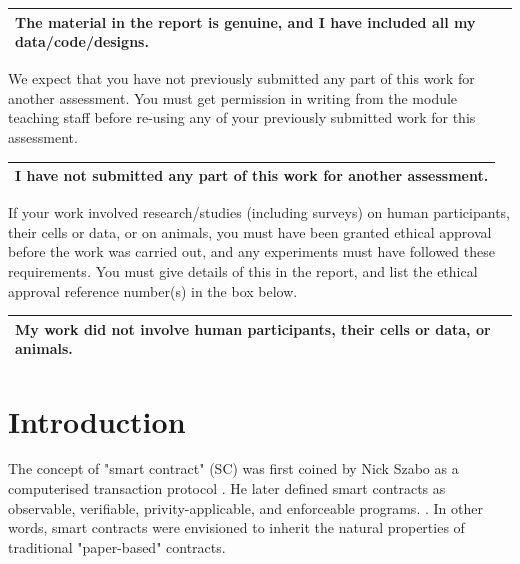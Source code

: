 \documentclass[oneside]{ecsproject}     %
\begin{document}
\footnotesize
\begin{tabular}{|p{\textwidth}|}
\hline
\textbf{The material in the report is genuine, and I have included all my data/code/designs. } \\
\hline
\end{tabular}
\small

 We expect that you have not previously submitted any part of this work for another assessment. You must get permission in writing from the module teaching staff before re-using any of your previously submitted work for this assessment.

\footnotesize
\begin{tabular}{|p{\textwidth}|}
\hline
\textbf{I have not submitted any part of this work for another assessment.} \\
\hline
\end{tabular}
\small

 If your work involved research/studies (including surveys) on human participants, their cells or data, or on animals, you must have been granted ethical approval before the work was carried out, and any experiments must have followed these requirements\textit{.} You must give details of this in the report, and list the ethical approval reference number(s) in the box below.

\footnotesize
\begin{tabular}{|p{\textwidth}|}
\hline
\textbf{My work did not involve human participants, their cells or data, or animals.} \\
\hline
\end{tabular}
\small

 \normalsize

\tableofcontents
\mainmatter


\chapter{Introduction}

The concept of "smart contract" (SC) was first coined by Nick Szabo as a computerised transaction protocol \cite{nz_sc}.
He later defined smart contracts as observable, verifiable, privity-applicable, and enforceable programs. \cite{nz_sc_bb}.
In other words, smart contracts were envisioned to inherit the natural properties of traditional "paper-based" contracts.
\end{document}
